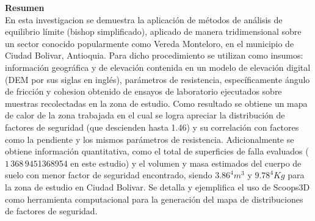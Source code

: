 \newpage
\textbf{\LARGE Resumen}\\
En esta investigacion se demuestra la aplicaci\'on de m\'etodos de an\'alisis de equilibrio l\'imite (bishop simplificado), aplicado de manera tridimensional sobre un sector conocido popularmente como Vereda Monteloro, en el municipio de Ciudad Bolivar, Antioquia. Para dicho procedimiento se utilizan como insumos: informaci\'on geogr\'afica y de elevaci\'on contenida en un modelo de elevaci\'on digital (DEM por sus siglas en ingl\'es), par\'ametros de resistencia, espec\'ificamente \'angulo de fricci\'on y cohesion obtenido de ensayos de laboratorio ejecutados sobre muestras recolectadas en la zona de estudio. Como resultado se obtiene un mapa de calor de la zona trabajada en el cual se logra apreciar la distribuci\'on de factores de seguridad (que descienden hasta 1.46) y su correlaci\'on con factores como la pendiente y los mismos par\'ametros de resistencia. Adicionalmente se obtiene informaci\'on quantitativa, como el total de superficies de falla evaluados (\(1\,368\,945\)1368954 en este estudio) y el volumen y masa estimados del cuerpo de suelo con menor factor de seguridad encontrado, siendo $3.86^{4}m^{3}$ y $9.78^{4}Kg$ para la zona de estudio en Ciudad Bolivar.
Se detalla y ejemplifica el uso de Scoops3D como herramienta computacional para la generaci\'on del mapa de distribuciones de factores de seguridad. 
\\\\
